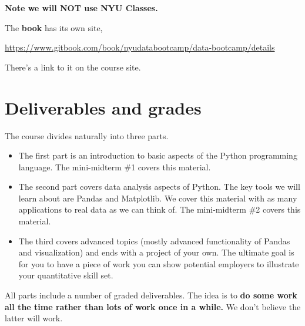 \textbf{Note we will NOT use NYU Classes.}

The {\bf book\/} has its own site,
\vspace{-0.15in}
\begin{center}
\url{https://www.gitbook.com/book/nyudatabootcamp/data-bootcamp/details}
\end{center}
\vspace{-0.15in}
%
There's a link to it on the course site.


\section*{Deliverables and grades}

The course divides naturally into three parts.
\begin{itemize}
\item The first part is an introduction to basic aspects of the Python programming language. The mini-midterm \#1 covers this material.
\item The second part covers data analysis aspects of Python. The key tools we will learn about are Pandas and Matplotlib. We cover this material with as many applications to real data as we can think of. The mini-midterm \#2 covers this material.
\item The third covers advanced topics (mostly advanced functionality of Pandas and visualization) and ends with a project of your own. The ultimate goal is for you to have a piece of work you can show potential employers to illustrate your quantitative skill set.
\end{itemize}
All parts include a number of graded deliverables. The idea is to {\bf do some work all the time rather than lots of work once in a while.} We don't believe the latter will work.

